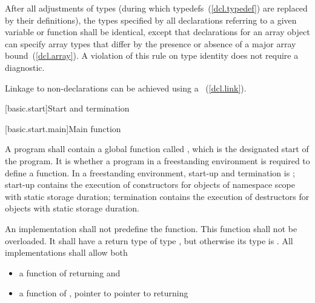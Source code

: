 \pnum
{}%
%
After all adjustments of types (during which
typedefs~(\ref{dcl.typedef}) are replaced by their definitions), the
types specified by all declarations referring to a given variable or
function shall be identical, except that declarations for an array
object can specify array types that differ by the presence or absence of
a major array bound~(\ref{dcl.array}). A violation of this rule on type
identity does not require a diagnostic.

\pnum
\enternote Linkage to non-\Cpp declarations can be achieved using a
~(\ref{dcl.link}). \exitnote%

[basic.start]{Start and termination}

[basic.start.main]{Main function}

\pnum
{}%
%
A program shall contain a global function called , which is the designated
start of the program. It is 
whether a program in a freestanding environment is required to define a 
function. \enternote In a freestanding environment, start-up and termination is
; start-up contains the
execution of constructors for objects of namespace scope with static storage duration;
termination contains the execution of destructors for objects with static storage
duration. \exitnote

\pnum
An implementation shall not predefine the  function. This
function shall not be overloaded. It shall have a return type of type
, but otherwise its type is .
%
All implementations shall allow both

\begin{itemize}
\item a function of \tcode{()} returning  and
\item a function of , pointer to pointer to  returning 
\end{itemize}

